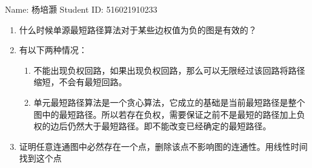 \documentclass[12pt,a4paper]{article}
\makeatletter
\newtheorem*{solution}{Solution}
\theoremstyle{definition}
\renewenvironment{solution}[1][Solution] {\par\pushQED{\qed}\normalfont\topsep6\p@\@plus6\p@\relax\trivlist\item[\hskip\labelsep\bfseries#1\@addpunct{.}]\ignorespaces}{\popQED\endtrivlist\@endpefalse} \makeatother
\makeatother
\begin{document}
\noindent

\noindent{}
\begin{center}

\footnotesize{\color{black} Name: 杨培灏  \quad Student ID: 516021910233}
\end{center}

\begin{enumerate}

\item  什么时候单源最短路径算法对于某些边权值为负的图是有效的？

\begin{solution}
	有以下两种情况：
	\begin{enumerate}
		\item 不能出现负权回路，如果出现负权回路，那么可以无限经过该回路将路径缩短，不会有最短回路。
		\item 单元最短路径算法是一个贪心算法，它成立的基础是当前最短路径是整个图中的最短路径。所以若存在负权，需要保证之前不是最短的路径加上负权的边后仍然大于最短路径。即不能改变已经确定的最短路径。
	\end{enumerate}
\end{solution}

\item 证明任意连通图中必然存在一个点，删除该点不影响图的连通性。用线性时间找到这个点


\end{enumerate}
\end{document}
